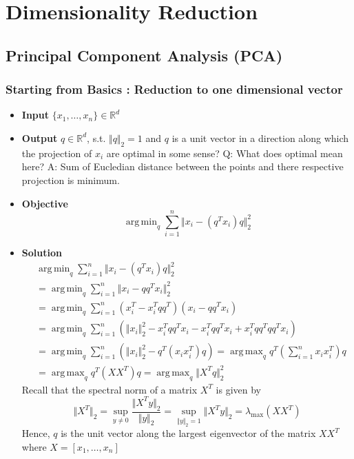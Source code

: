 \documentclass{article}
\DeclareMathOperator*{\argmax}{arg\,max}
\DeclareMathOperator*{\argmin}{arg\,min}
\begin{document}
\section{Dimensionality Reduction}


\subsection{Principal Component Analysis (PCA)}

\subsubsection{Starting from Basics : Reduction to one dimensional vector}
\begin{itemize}
    \item \textbf{Input} $\{x_1, \dots, x_n\} \in \mathbb{R}^d$
    \item \textbf{Output} $q \in \mathbb{R}^d$, s.t. $\Vert q \Vert_2=1$ and $q$ is a unit vector in a direction along which the projection of $x_i$ are optimal in some sense? Q: What does optimal mean here? A: Sum of Eucledian distance between the points and there respective projection is minimum.
    \item \textbf{Objective} 
        $$\argmin_{q} \sum_{i=1}^n \Vert x_i - (q^Tx_i)q \Vert_2^2  $$
    \item \textbf{Solution} 
        \begin{align*}
            & \argmin_{q} \sum_{i=1}^n \Vert x_i - (q^Tx_i)q \Vert_2^2 \\
            &= \argmin_{q} \sum_{i=1}^n \Vert x_i - qq^Tx_i \Vert_2^2 \\
            &= \argmin_{q} \sum_{i=1}^n (x_i^T - x_i^Tqq^T)(x_i - qq^Tx_i) \\
            &= \argmin_{q} \sum_{i=1}^n \left( \Vert x_i \Vert_2^2 - x_i^Tqq^Tx_i - x_i^Tqq^Tx_i + x_i^Tqq^Tqq^Tx_i \right)\\
            &= \argmin_{q} \sum_{i=1}^n \left( \Vert x_i \Vert_2^2 - q^T(x_ix_i^T)q \right)
            = \argmax_{q} q^T( \sum_{i=1}^n x_ix_i^T)q\\
            &= \argmax_{q} q^T( XX^T )q = \argmax_{q} \Vert X^Tq \Vert_2^2
        \end{align*}
        Recall that the spectral norm of a matrix $X^T$ is given by
        $$\Vert X^T\Vert_2 = \sup_{y \neq 0} \frac{\Vert X^Ty \Vert_2}{\Vert y \Vert_2} = \sup_{\Vert y \Vert_2 = 1} \Vert X^Ty \Vert_2 = \lambda_{\text{max}}(XX^T)$$
        Hence, $q$ is the unit vector along the largest eigenvector of the matrix $XX^T$ where $X = [x_1, \dots, x_n]$
\end{itemize}
\end{document}
